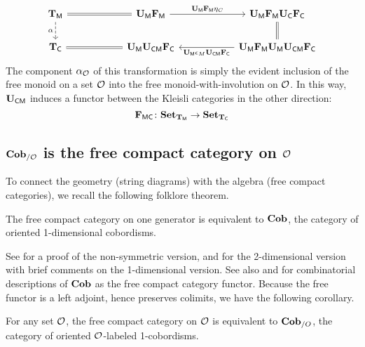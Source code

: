\documentclass[11pt,oneside,article]{memoir}
\begin{document}
\begin{equation*}
   \begin{tikzcd}[column sep=2cm]
      \TM\ar[r,equal]\ar[d,dashed,"\alpha"']&\UM\FM\ar[r,"\UM\FM\eta_C"]&\UM\FM\UC\FC\ar[d,equal]\\
      \TC&\UM\UCM\FC\ar[l,equal]&\UM\FM\UM\UCM\FC\ar[l,"\UM\epsilon_M\UCM\FC"]
   \end{tikzcd}
\end{equation*}
The component $\alpha_{\mathcal{O}}$ of this transformation is simply the evident inclusion of the free
monoid on a set $\mathcal{O}$ into the free monoid-with-involution on $\mathcal{O}$. In this way, $\mathbf{U}_{\mathsf{CM}}$
induces a functor between the Kleisli categories in the other direction:
\begin{equation}\label{eqn:FMC}
   \mathbf{F}_{\mathsf{MC}}\colon\mathbf{Set}_{\mathbf{T}_{\mathsf{M}}}\to\mathbf{Set}_{\mathbf{T}_{\mathsf{C}}}
\end{equation}


\subsection{$\mathbf{Cob}_{/\mathcal{O}}$ is the free compact category on $\mathcal{O}$}

To connect the geometry (string diagrams) with the algebra (free compact categories), we recall the
following folklore theorem.

\begin{theorem}
The free compact category on one generator is equivalent to $\mathbf{Cob}$, the category of oriented
1-dimensional cobordisms.
\end{theorem}

See \cite[Theorem 3.6]{FreydYetter} for a proof of the non-symmetric version, \cite{Kock} and
\cite{BaezDolan} for the 2-dimensional version with brief comments on the 1-dimensional version. See
also \cite{KellyLaplaza} and \cite{Abramsky2} for combinatorial descriptions of $\mathbf{Cob}$ as the free
compact category functor.  Because the free functor is a left adjoint, hence preserves colimits, we
have the following corollary.

\begin{corollary}\label{cor:free_compact_is_Cob}
   For any set $\mathcal{O}$, the free compact category on $\mathcal{O}$ is equivalent to $\mathbf{Cob}_{/O}$, the
   category of oriented $\mathcal{O}$-labeled 1-cobordisms.
\end{corollary}

\end{document}

